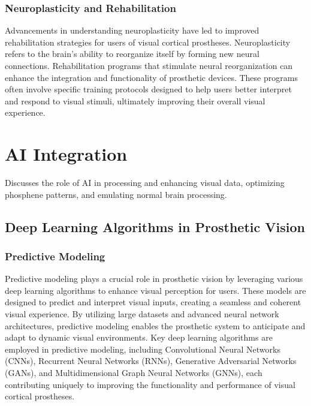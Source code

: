 \documentclass[twocolumn,10pt]{article}
\begin{document}
\subsubsection*{Neuroplasticity and Rehabilitation}
Advancements in understanding neuroplasticity have led to improved
rehabilitation strategies for users of visual cortical prostheses.
Neuroplasticity refers to the brain's ability to reorganize itself by forming
new neural connections. Rehabilitation programs that stimulate neural
reorganization can enhance the integration and functionality of prosthetic
devices. These programs often involve specific training protocols designed to
help users better interpret and respond to visual stimuli, ultimately improving
their overall visual experience.

\section{AI Integration}\label{sec:ai_integration}
Discusses the role of AI in processing and enhancing visual data, optimizing
phosphene patterns, and emulating normal brain processing.


\subsection{Deep Learning Algorithms in Prosthetic Vision}
\subsubsection*{Predictive Modeling}
Predictive modeling plays a crucial role in prosthetic vision by leveraging
various deep learning algorithms to enhance visual perception for users. These
models are designed to predict and interpret visual inputs, creating a seamless
and coherent visual experience. By utilizing large datasets and advanced neural
network architectures, predictive modeling enables the prosthetic system to
anticipate and adapt to dynamic visual environments. Key deep learning
algorithms are employed in predictive modeling, including
Convolutional Neural Networks (CNNs), Recurrent Neural Networks (RNNs),
Generative Adversarial Networks (GANs), and Multidimensional Graph Neural
Networks (GNNs), each contributing uniquely to improving the functionality and
performance of visual cortical prostheses.
\end{document}
